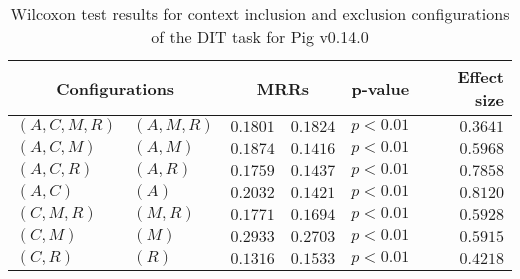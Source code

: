 
\begin{table}
\begin{spacing}{1.2}
\centering
\caption{Wilcoxon test results for context inclusion and exclusion configurations of the DIT task for Pig v0.14.0}
\label{table:versus-wilcox-pig-dit-context}
\begin{tabular}{ll|rr|rr}
\toprule
      \multicolumn{2}{c|}{Configurations} &          \multicolumn{2}{c|}{MRRs} &       p-value & Effect size \\
\midrule
 $(A,C,M,R)$ &  $(A,M,R)$ & $0.1801$ & $0.1824$ & $p<0.01$ &    $0.3641$ \\
   $(A,C,M)$ &    $(A,M)$ & $0.1874$ & $0.1416$ & $p<0.01$ &    $0.5968$ \\
   $(A,C,R)$ &    $(A,R)$ & $0.1759$ & $0.1437$ & $p<0.01$ &    $0.7858$ \\
     $(A,C)$ &      $(A)$ & $0.2032$ & $0.1421$ & $p<0.01$ &    $0.8120$ \\
   $(C,M,R)$ &    $(M,R)$ & $0.1771$ & $0.1694$ & $p<0.01$ &    $0.5928$ \\
     $(C,M)$ &      $(M)$ & $0.2933$ & $0.2703$ & $p<0.01$ &    $0.5915$ \\
     $(C,R)$ &      $(R)$ & $0.1316$ & $0.1533$ & $p<0.01$ &    $0.4218$ \\
\bottomrule
\end{tabular}

\end{spacing}
\end{table}

